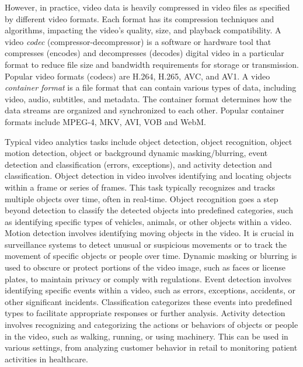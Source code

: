 However, in practice, video data is heavily compressed in video files as specified by different video formats. Each format has its compression techniques and algorithms, impacting the video's quality, size, and playback compatibility. A video \emph{codec} (compressor-decompressor) is a software or hardware tool that compresses (encodes) and decompresses (decodes) digital video in a particular format to reduce file size and bandwidth requirements for storage or transmission. Popular video formats (codecs) are H.264, H.265, AVC, and AV1. A video \emph{container format} is a file format that can contain various types of data, including video, audio, subtitles, and metadata. The container format determines how the data streams are organized and synchronized to each other. Popular container formats include MPEG-4, MKV, AVI, VOB and WebM.

Typical video analytics tasks include object detection, object recognition, object motion detection, object or background dynamic masking/blurring, event detection and classification (errors, exceptions), and activity detection and classification. Object detection in video involves identifying and locating objects within a frame or series of frames. This task typically recognizes and tracks multiple objects over time, often in real-time. Object recognition goes a step beyond detection to classify the detected objects into predefined categories, such as identifying specific types of vehicles, animals, or other objects within a video. Motion detection involves identifying moving objects in the video. It is crucial in surveillance systems to detect unusual or suspicious movements or to track the movement of specific objects or people over time. Dynamic masking or blurring is used to obscure or protect portions of the video image, such as faces or license plates, to maintain privacy or comply with regulations. Event detection involves identifying specific events within a video, such as errors, exceptions, accidents, or other significant incidents. Classification categorizes these events into predefined types to facilitate appropriate responses or further analysis.  Activity detection involves recognizing and categorizing the actions or behaviors of objects or people in the video, such as walking, running, or using machinery. This can be used in various settings, from analyzing customer behavior in retail to monitoring patient activities in healthcare.

